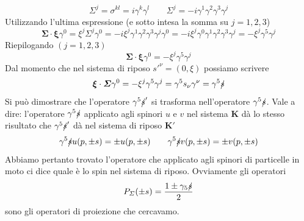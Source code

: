 $$
\Sigma^j=\sigma^{kl}=i\gamma^k\gamma^l \qquad \Sigma^j=-i\gamma^1\gamma^2\gamma^3\gamma^j
$$
Utilizzando l'ultima espressione (e sotto intesa la somma su $j=1,2,3$)
$$
\boldsymbol{\Sigma} \cdot \boldsymbol{\xi} \gamma^0 = \xi^j \Sigma^j \gamma^0 = -i \xi^j \gamma^1 \gamma^2 \gamma^3 \gamma^j \gamma^0 = -i \xi^j \gamma^0 \gamma^1 \gamma^2 \gamma^3 \gamma^j = - \xi^j \gamma^5 \gamma^j
$$
Riepilogando $(j=1,2,3)$
$$
\boldsymbol{\Sigma} \cdot \boldsymbol{\xi} \gamma^0=- \xi^j \gamma^5 \gamma^j
$$
Dal momento che nel sistema di riposo $s'^\nu=(0,\xi)$ possiamo scrivere
$$
\boldsymbol{\xi} \cdot \boldsymbol{\Sigma}\gamma^0 = -\xi^j \gamma^5 \gamma^j = \gamma^5 s_\nu \gamma^\nu = \gamma^5 \slashed{s}
$$
Si può dimostrare che l'operatore $\gamma^5 \slashed{s}'$ si trasforma nell'operatore $\gamma^5 \slashed{s}$. Vale a dire: l'operatore $\gamma^5\slashed{s}$ applicato agli spinori $u$ e $v$ nel sistema $\mathbf{K}$ dà lo stesso risultato che $\gamma^5 \slashed{s}'$ dà nel sistema di riposo $\mathbf{K}'$
$$
\gamma^5 \slashed{s} u(p, \pm s) = \pm u(p, \pm s) \qquad \gamma^5 \slashed{s} v(p, \pm s) = \pm v(p, \pm s)
$$
Abbiamo pertanto trovato l'operatore che applicato agli spinori di particelle in moto ci dice quale è lo spin nel sistema di riposo. Ovviamente gli operatori
$$
P_\Sigma(\pm s) = \frac{1 \pm \gamma_5 \slashed{s}}{2}
$$
sono gli operatori di proiezione che cercavamo.
